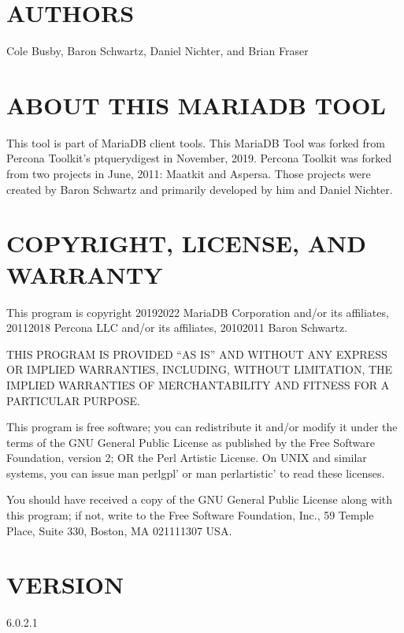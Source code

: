 \documentclass[letterpaper,10pt,english]{sphinxmanual}
\begin{document}
\section{AUTHORS}
\label{\detokenize{mariadb-query-digest:authors}}
Cole Busby, Baron Schwartz, Daniel Nichter, and Brian Fraser


\section{ABOUT THIS MARIADB TOOL}
\label{\detokenize{mariadb-query-digest:about-this-mariadb-tool}}
This tool is part of MariaDB client tools. This MariaDB Tool was forked from
Percona Toolkit’s pt\sphinxhyphen{}query\sphinxhyphen{}digest in November, 2019.  Percona Toolkit was
forked from two projects in June, 2011: Maatkit and Aspersa.  Those projects
were created by Baron Schwartz and primarily developed by him and Daniel
Nichter.


\section{COPYRIGHT, LICENSE, AND WARRANTY}
\label{\detokenize{mariadb-query-digest:copyright-license-and-warranty}}
This program is copyright 2019\sphinxhyphen{}2022 MariaDB Corporation and/or its affiliates,
2011\sphinxhyphen{}2018 Percona LLC and/or its affiliates, 2010\sphinxhyphen{}2011 Baron Schwartz.

THIS PROGRAM IS PROVIDED “AS IS” AND WITHOUT ANY EXPRESS OR IMPLIED
WARRANTIES, INCLUDING, WITHOUT LIMITATION, THE IMPLIED WARRANTIES OF
MERCHANTABILITY AND FITNESS FOR A PARTICULAR PURPOSE.

This program is free software; you can redistribute it and/or modify it under
the terms of the GNU General Public License as published by the Free Software
Foundation, version 2; OR the Perl Artistic License.  On UNIX and similar
systems, you can issue \textasciigrave{}man perlgpl’ or \textasciigrave{}man perlartistic’ to read these
licenses.

You should have received a copy of the GNU General Public License along with
this program; if not, write to the Free Software Foundation, Inc., 59 Temple
Place, Suite 330, Boston, MA  02111\sphinxhyphen{}1307  USA.


\section{VERSION}
\label{\detokenize{mariadb-query-digest:version}}
 6.0.2.1
\end{document}
